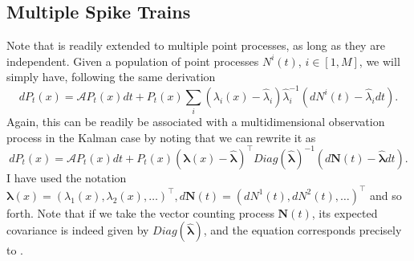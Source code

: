 \subsection{Multiple Spike Trains}

Note that  is readily extended to multiple point processes, as long as they are independent. Given a population of point processes $N^i(t)$, $i\in [1,M]$, we will simply have, following the same derivation
\begin{equation}
\label{eq:snyder_multi}
dP_t(x) = \mathcal{A}P_t(x) dt + P_t(x)\sum_i\left(\lambda_i(x)-\hat{\lambda}_i\right)\hat{\lambda}_i^{-1}\left(dN^i(t)-\hat{\lambda}_i dt\right).
\end{equation}
Again, this can be readily be associated with a multidimensional observation process in the Kalman case by noting that we can rewrite it as
\begin{equation}
\nonumber
dP_t(x) = \mathcal{A}P_t(x) dt + P_t(x)\left(\boldsymbol{\lambda}(x)-\hat{\boldsymbol{\lambda}}\right)^\top Diag(\hat{\boldsymbol{\lambda}})^{-1}\left(d\boldsymbol{N}(t)-\hat{\boldsymbol{\lambda}} dt\right).
\end{equation}
I have used the notation $\boldsymbol{\lambda}(x) = (\lambda_1(x),\lambda_2(x),\ldots)^\top, d\boldsymbol{N}(t) = (dN^1(t), dN^2(t),\ldots)^\top$ and so forth. Note that if we take the vector counting process $\boldsymbol{N}(t)$, its expected covariance is indeed given by $Diag(\hat{\boldsymbol{\lambda}})$, and the equation corresponds precisely to .

